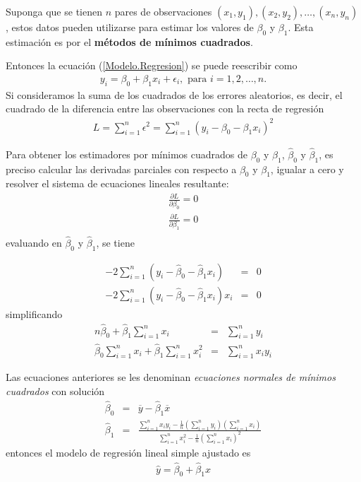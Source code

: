 Suponga que se tienen $n$ pares de observaciones $\left(x_{1},y_{1}\right),\left(x_{2},y_{2}\right),\ldots,\left(x_{n},y_{n}\right)$,  estos datos pueden utilizarse para estimar los valores de $\beta_{0}$ y $\beta_{1}$. Esta estimaci\'on es por el \textbf{m\'etodos de m\'inimos cuadrados}.

Entonces la ecuaci\'on (\ref{Modelo.Regresion}) se puede reescribir como
\begin{eqnarray}\label{Modelo.Regresion.dos}
y_{i}=\beta_{0}+\beta_{1}x_{i}+\epsilon_{i},\textrm{ para }i=1,2,\ldots,n.
\end{eqnarray}
Si consideramos la suma de los cuadrados de los errores aleatorios, es decir, el cuadrado de la diferencia entre las observaciones con la recta de regresi\'on 
\begin{eqnarray}
L=\sum_{i=1}^{n}\epsilon^{2}=\sum_{i=1}^{n}\left(y_{i}-\beta_{0}-\beta_{1}x_{i}\right)^{2}
\end{eqnarray}





Para obtener los estimadores por m\'inimos cuadrados de $\beta_{0}$ y $\beta_{1}$,  $\hat{\beta}_{0}$ y $\hat{\beta}_{1}$, es preciso calcular las derivadas parciales con respecto a $\beta_{0}$ y $\beta_{1}$,  igualar a cero y  resolver el sistema de ecuaciones lineales resultante:
\begin{eqnarray*}
\frac{\partial L}{\partial \beta_{0}}=0\\
\frac{\partial L}{\partial \beta_{1}}=0\\
\end{eqnarray*}
evaluando en $\hat{\beta}_{0}$ y $\hat{\beta}_{1}$, se tiene 

\begin{eqnarray*}
-2\sum_{i=1}^{n}\left(y_{i}-\hat{\beta}_{0}-\hat{\beta}_{1}x_{i}\right)&=&0\\
-2\sum_{i=1}^{n}\left(y_{i}-\hat{\beta}_{0}-\hat{\beta}_{1}x_{i}\right)x_{i}&=&0
\end{eqnarray*}
simplificando
\begin{eqnarray*}
n\hat{\beta}_{0}+\hat{\beta}_{1}\sum_{i=1}^{n}x_{i}&=&\sum_{i=1}^{n}y_{i}\\
\hat{\beta}_{0}\sum_{i=1}^{n}x_{i}+\hat{\beta}_{1}\sum_{i=1}^{n}x_{i}^{2}&=&\sum_{i=1}^{n}x_{i}y_{i}
\end{eqnarray*}





Las ecuaciones anteriores se les denominan \textit{ecuaciones normales de m\'inimos cuadrados} con soluci\'on
\begin{eqnarray}
\hat{\beta}_{0}&=&\overline{y}-\hat{\beta}_{1}\overline{x}\\
\hat{\beta}_{1}&=&\frac{\sum_{i=1}^{n}x_{i}y_{i}-\frac{1}{n}\left(\sum_{i=1}^{n}y_{i}\right)\left(\sum_{i=1}^{n}x_{i}\right)}{\sum_{i=1}^{n}x_{i}^{2}-\frac{1}{n}\left(\sum_{i=1}^{n}x_{i}\right)^{2}}
\end{eqnarray}
entonces el modelo de regresi\'on lineal simple ajustado es
\begin{eqnarray}
\hat{y}=\hat{\beta}_{0}+\hat{\beta}_{1}x
\end{eqnarray}

